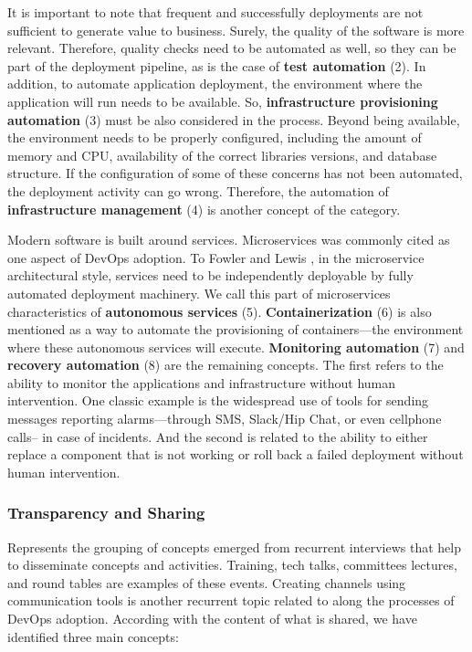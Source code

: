 It is important to note that frequent and successfully
deployments are not sufficient to generate value to business. Surely, the quality of 
the software is more relevant. Therefore, quality checks need to be automated as well, so they can be part of the
deployment pipeline, as is the case of \textbf{test automation} (2). In addition, to
automate application deployment, the environment where the
application will run needs to be available. So, \textbf{infrastructure
provisioning automation} (3) must be also considered in the process. Beyond being available,
the environment needs to be properly configured, including the amount of memory and CPU,
availability of the correct libraries versions, and database structure. If the configuration of some of these concerns
has not been automated, the deployment activity can go wrong. Therefore,
the automation of \textbf{infrastructure management} (4) is another
concept of the  category.

Modern software is built around services. Microservices  was commonly cited
as one aspect of DevOps adoption. To Fowler and Lewis
\cite{martinfowler2014microservices}, in the
microservice architectural style, services need to be independently deployable
by fully automated deployment machinery. We call this part of microservices
characteristics of \textbf{autonomous services} (5). \textbf{Containerization}
(6) is also mentioned as a way to automate the provisioning of containers---the
environment where these autonomous services will execute.
\textbf{Monitoring automation} (7) and \textbf{recovery automation} (8) are the
remaining concepts. The first refers to the ability to monitor the
applications and infrastructure without human intervention. One classic example
is the widespread use of tools for sending messages reporting
alarms---through SMS, Slack/Hip Chat, or even
cellphone calls-- in case of incidents. And the second is related to the ability
to either replace a component that is not working or
roll back a failed deployment without human intervention.

\subsubsection{Transparency and Sharing} Represents the grouping of concepts
emerged from recurrent interviews that help to disseminate concepts and
activities. Training, tech talks, committees lectures, and round tables
are examples of these events. Creating
channels using communication tools is another recurrent topic
related to  along the processes of DevOps adoption.
According with the content of what is shared, we
have identified three main concepts:

